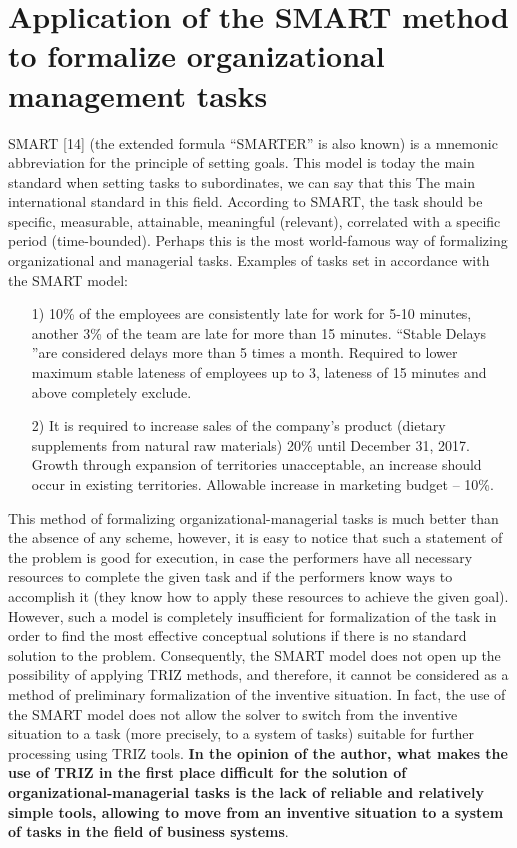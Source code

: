 \documentclass[11pt,a4paper]{book}
\begin{document}
\section[The SMART method]{Application of the SMART method to formalize
  organizational management tasks}

SMART [14] (the extended formula “SMARTER” is also known) is a mnemonic
abbreviation for the principle of setting goals. This model is today the main
standard when setting tasks to subordinates, we can say that this The main
international standard in this field. According to SMART, the task should be
specific, measurable, attainable, meaningful (relevant), correlated with a
specific period (time-bounded). Perhaps this is the most world-famous way of
formalizing organizational and managerial tasks.  Examples of tasks set in
accordance with the SMART model:
\begin{itemize}\it
\item [1)] 10\% of the employees are consistently late for work for 5-10
  minutes, another 3\% of the team are late for more than 15 minutes. “Stable
  Delays ”are considered delays more than 5 times a month. Required to lower
  maximum stable lateness of employees up to 3, lateness of 15 minutes and
  above completely exclude.
\item[2)] It is required to increase sales of the company's product (dietary
  supplements from natural raw materials) 20\% until December 31, 2017. Growth
  through expansion of territories unacceptable, an increase should occur in
  existing territories.  Allowable increase in marketing budget -- 10\%.
\end{itemize}

This method of formalizing organizational-managerial tasks is much better than
the absence of any scheme, however, it is easy to notice that such a statement
of the problem is good for execution, in case the performers have all
necessary resources to complete the given task and if the performers know ways
to accomplish it (they know how to apply these resources to achieve the given
goal). However, such a model is completely insufficient for formalization of
the task in order to find the most effective conceptual solutions if there is
no standard solution to the problem. Consequently, the SMART model does not
open up the possibility of applying TRIZ methods, and therefore, it cannot be
considered as a method of preliminary formalization of the inventive
situation.  In fact, the use of the SMART model does not allow the solver to
switch from the inventive situation to a task (more precisely, to a system of
tasks) suitable for further processing using TRIZ tools. \textbf{In the
  opinion of the author, what makes the use of TRIZ in the first place
  difficult for the solution of organizational-managerial tasks is the lack of
  reliable and relatively simple tools, allowing to move from an inventive
  situation to a system of tasks in the field of business systems}.
\end{document}
